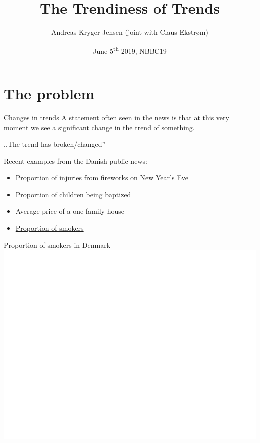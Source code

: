 \documentclass[ignorenonframetext,xcolor=pdflatex,table,dvipsnames,serif]{beamer}
\title{The Trendiness of Trends}
\date{June 5\textsuperscript{th} 2019, NBBC19}
\author{Andreas Kryger Jensen \scriptsize (joint with Claus Ekstrøm)}
\institute{Biostatistics, Institute of Public Health\\ University of Copenhagen}
\begin{document}
\frame[plain]{\titlepage}
 
 

\section{The problem}

\begin{frame}{Changes in trends}
A statement often seen in the news is that at \alert{this very moment} we see a significant change in the trend of something.

\vspace{0.5cm}

\begin{center}
,,The trend has broken/changed''
\end{center}

\vspace{0.5cm}

Recent examples from the Danish public news:
\begin{itemize}
  \item{Proportion of injuries from fireworks on New Year's Eve}
  \item{Proportion of children being baptized}
  \item{Average price of a one-family house}
  \item{\underline{Proportion of smokers}}
\end{itemize}
\end{frame}


\begin{frame}{Proportion of smokers in Denmark}
\center\includegraphics[scale=0.5]{smokersData}
\end{frame}
\end{document}
